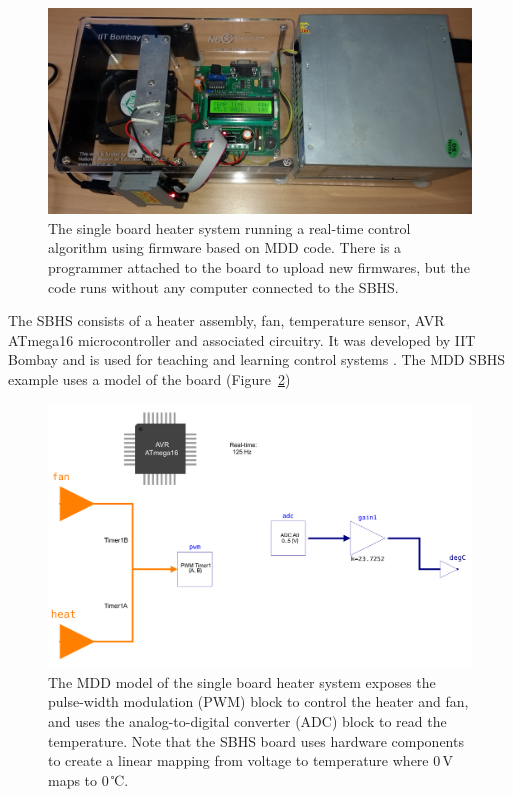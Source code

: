 \documentclass{resources/modelica}
\begin{document}
\begin{figure}
  \centering
  \includegraphics[width=0.9\columnwidth]{figures/SBHS.jpg}
  \caption{The single board heater system running a real-time control algorithm using firmware based on MDD code. There is a programmer attached to the board to upload new firmwares, but the code runs without any computer connected to the SBHS.}
  \label{fig:sbhs}
\end{figure}
The SBHS consists of a heater assembly, fan, temperature sensor, AVR ATmega16 microcontroller and associated circuitry.
It was developed by IIT Bombay and is used for teaching and learning control systems \cite{Arora2010}.
The MDD SBHS example uses a model of the board (Figure~\ref{fig:sbhsboard})
\begin{figure}
  \centering
  \includegraphics[width=0.9\columnwidth]{figures/SBHSBoard.pdf}
  \caption{The MDD model of the single board heater system exposes the pulse-width modulation (PWM) block to control the heater and fan, and uses the analog-to-digital converter (ADC) block to read the temperature. Note that the SBHS board uses hardware components to create a linear mapping from voltage to temperature where $0\,\mathrm{V}$ maps to $0\,$℃.}
  \label{fig:sbhsboard}
\end{figure}
\end{document}
